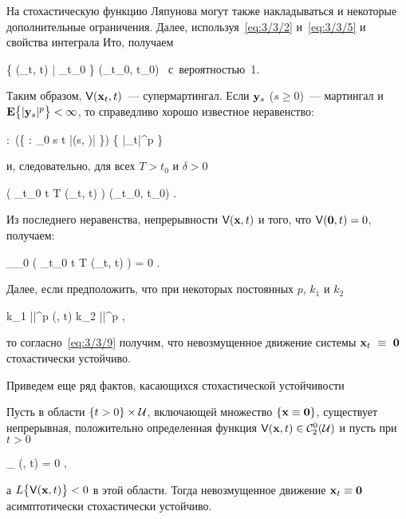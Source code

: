 На стохастическую функцию Ляпунова могут также накладываться и некоторые дополнительные ограничения. Далее, используя~\ref{eq:3/3/2} и~\ref{eq:3/3/5} и свойства интеграла Ито, получаем

	\E \bigl\{ \funcV(_t, t) \bigm| \funcF_{t_0} \bigr\} \leqslant \funcV(_{t_0}, t_0) \mbox{ с вероятностью 1.}
\eeq

Таким образом, $\mathsf{V}(\mathbf{x}_t, t)$~--- супермартингал. Если $\mathbf{y}_s$ ($s \geqslant 0$)~--- мартингал и $\mathbf{E} \bigl\{ |\mathbf{y}_s|^p \bigr\} < \infty$, то справедливо хорошо известное неравенство:

	\forall \alpha:~\prob\Biggl(\bigl\{ \omega \in \Omega : \sup\limits_{0 \leqslant s \leqslant t} |(s, \omega)| \geqslant \alpha \bigr\}\Biggr) \leqslant {} \E \bigl\{ |_t|^p \bigr\}
\eeq

и, следовательно, для всех $T > t_0$ и $\delta > 0$

	\prob\Biggl( \sup\limits_{t_0 \leqslant t \leqslant T} \funcV(_t, t) \geqslant \delta \Biggr) \leqslant {} \funcV(_{t_0}, t_0) \mbox{.}
\eeq

Из последнего неравенства, непрерывности $\mathsf{V}(\mathbf{x}, t)$ и того, что $\mathsf{V}(\mathbf{0}, t) = 0$, получаем:

	\lim\limits_{_0 \to {}} \prob\Biggl( \sup\limits_{t_0 \leqslant t \leqslant T} \funcV(_t, t) \geqslant \delta \Biggr) = 0 \mbox{.}
\eeq

Далее, если предположить, что при некоторых постоянных $p$, $k_1$ и $k_2$

	k_1 ||^p \leqslant \funcV(, t) \leqslant k_2 ||^p \mbox{,}
\eeq

то согласно~\ref{eq:3/3/9} получим, что невозмущенное движение системы $\mathbf{x}_t~\equiv~\mathbf{0}$ стохастически устойчиво.

\br

Приведем еще ряд фактов\cite{HASMINSKI}, касающихся стохастической устойчивости

	Пусть в области $\{ t > 0 \} \times \mathcal{U}$, включающей множество $\{ \mathbf{x} \equiv \mathbf{0} \}$, существует непрерывная, положительно определенная функция $\mathsf{V}(\mathbf{x}, t) \in \mathcal{C}_2^0(\mathcal{U})$ и пусть при $t > 0$
	
		\beqn
			\limsup\limits_{ \to {}} \funcV(, t) = 0 \mbox{,}
		\eeqn
		
		а $L\bigl\{ \mathsf{V}(\mathbf{x}, t) \bigr\} < 0$ в этой области. Тогда невозмущенное движение $\mathbf{x}_t \equiv \mathbf{0}$ асимптотически стохастически устойчиво.
\eteo


